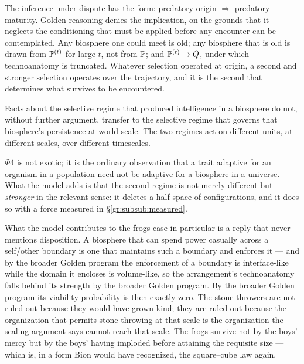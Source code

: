 The inference under dispute has the form: predatory origin
$\Rightarrow$ predatory maturity. Golden reasoning denies the
implication, on the grounds that it neglects the conditioning that must
be applied before any encounter can be contemplated. Any biosphere one could meet is old; any biosphere
that is old is drawn from $\mathbb{P}^{(t)}$ for large $t$, not from $\mathbb{P}$; and
$\mathbb{P}^{(t)}\to Q$, under which technoanatomy is truncated. Whatever
selection operated at origin, a second and stronger selection operates
over the trajectory, and it is the second that determines what survives
to be encountered.

\setcounter{premise}{3} %
\begin{premise}
\label{gr:phi4}
Facts about the selective regime that produced intelligence in a
biosphere do not, without further argument, transfer to the selective
regime that governs that biosphere's persistence at world scale. The two
regimes act on different units, at different scales, over different
timescales.
\end{premise}

$\Phi4$ is not exotic; it is the ordinary observation that a trait
adaptive for an organism in a population need not be adaptive for a
biosphere in a universe. What the model adds is that the second regime
is not merely different but \emph{stronger} in the relevant sense: it
deletes a half-space of configurations, and it does so with a force
measured in \S\ref{gr:subsub:measured}.

What the model contributes to the frogs case in particular is a reply
that never mentions disposition. A biosphere that can spend power
casually across a self/other boundary is one that maintains such a
boundary and enforces it --- and by the broader Golden program the
enforcement of a boundary is interface-like while the domain it encloses
is volume-like, so the arrangement's technoanatomy falls behind its strength by
the broader Golden program. By the broader Golden program its
viability probability is then exactly zero. The stone-throwers are not
ruled out because they would have grown kind; they are ruled out
because the organization that permits stone-throwing at that scale is
the organization the scaling argument says cannot reach that scale. The
frogs survive not by the boys' mercy but by the boys' having imploded
before attaining the requisite size --- which is, in a form Bion would
have recognized, the square--cube law again.

